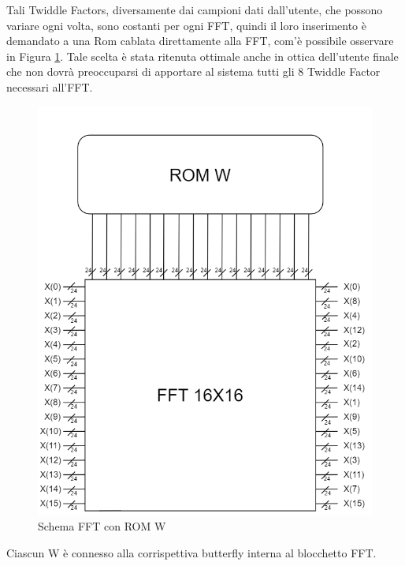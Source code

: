 \documentclass[a4paper, titlepage]{article}
\begin{document}
Tali Twiddle Factors, diversamente dai campioni dati dall'utente, che possono variare ogni volta, sono costanti per ogni FFT, quindi il loro inserimento è demandato a una Rom cablata direttamente alla FFT, com'è possibile osservare in Figura \ref{fig: ROM W}. Tale scelta è stata ritenuta ottimale anche in ottica dell'utente finale che non dovrà preoccuparsi di apportare al sistema tutti gli 8 Twiddle Factor necessari all'FFT.
\\
\begin{figure}[h]
    \centering
    \includegraphics[scale=0.35]{ROM_W_FFT.png}
    \caption{Schema FFT con ROM W}
    \label{fig: ROM W}
\end{figure}
Ciascun W è connesso alla corrispettiva butterfly interna al blocchetto FFT.\\
\end{document}
